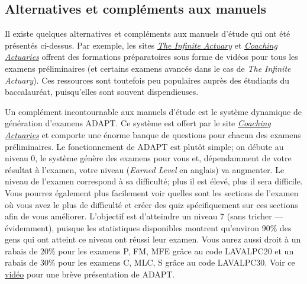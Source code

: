 \newpage

\subsection*{Alternatives et compléments aux manuels}
\label{subsec:alternatives}
Il existe quelques alternatives et compléments aux manuels d'étude qui ont été présentés ci-dessus. Par exemple, les sites \href{http://www.theinfiniteactuary.com/}{\emph{The Infinite Actuary}} et \href{https://www.coachingactuaries.com/}{\emph{Coaching Actuaries}} offrent des formations préparatoires sous forme de vidéos pour tous les examens préliminaires (et certains examens avancés dans le cas de \emph{The Infinite Actuary}). Ces ressources sont toutefois peu populaires auprès des étudiants du baccalauréat, puisqu'elles sont souvent dispendieuses.\vspace{\baselineskip}

Un complément incontournable aux manuels d'étude est le système dynamique de génération d'examens ADAPT. Ce système est offert par le site \href{https://www.coachingactuaries.com/}{\emph{Coaching Actuaries}} et comporte une énorme banque de questions pour chacun des examens préliminaires. Le fonctionnement de ADAPT est plutôt simple; on débute au niveau 0, le système génère des examens pour vous et, dépendamment de votre résultat à l'examen, votre niveau (\emph{Earned Level} en anglais) va augmenter. Le niveau de l'examen correspond à sa difficulté; plus il est élevé, plus il sera difficile. Vous pourrez également plus facilement voir quelles sont les sections de l'examen où vous avez le plus de difficulté et créer des quiz spécifiquement sur ces sections afin de vous améliorer. L'objectif est d'atteindre un niveau 7 (sans tricher --- évidemment), puisque les statistiques disponibles montrent qu'environ 90\% des gens qui ont atteint ce niveau ont réussi leur examen. Vous aurez aussi droit à un rabais de 20\% pour les examens P, FM, MFE grâce au code LAVALPC20 et un rabais de 30\% pour les examens C, MLC, S grâce au code LAVALPC30. Voir ce \href{https://www.youtube.com/watch?v=ZBxLa2J5jhs}{vidéo} pour une brève présentation de ADAPT.

\newpage